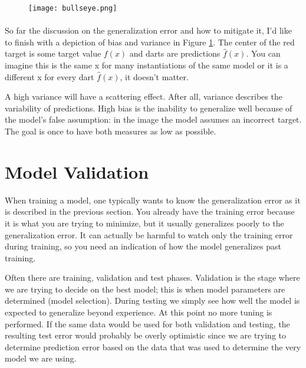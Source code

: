 \begin{figure}
\center
\texttt{[image: bullseye.png]}
\caption{}
\label{fig:bullseye}
\end{figure}

\paragraph{}
So far the discussion on the
generalization error and how to mitigate it,
I'd like to finish with a depiction
of bias and variance in Figure \ref{fig:bullseye}.
The center of the red target
is some target value $f(x)$
and darts are predictions $\hat{f}(x)$.
You can imagine this is the same x
for many instantiations of the same model
or it is a different x for every dart $\hat{f}(x)$,
it doesn't matter.

A high variance will have a scattering effect.
After all,
variance describes the variability of predictions.
High bias is the inability to generalize
well because of the model's false assumption:
in the image the model assumes an incorrect target.
The goal is once to have both measures as low as possible.

\section{Model Validation}
When training a model,
one typically wants to know the generalization error
as it is described in the previous section.
You already have the training error
because it is what you are trying to minimize,
but it usually generalizes poorly
to the generalization error.
It can actually be harmful to
watch only the training error during training,
so you need an indication of how the model
generalizes past training.

Often there are training, validation and test phases.
Validation is the stage
where we are trying to decide on the best model;
this is when model parameters are determined
(model selection).
During testing we simply see how well the model
is expected to generalize beyond experience.
At this point no more tuning is performed.
If the same data would be used for both validation
and testing,
the resulting test error
would probably be overly optimistic
\parencite{friedman2001elements}
since we are trying to determine prediction error
based on the data that was used to determine
the very model we are using.


